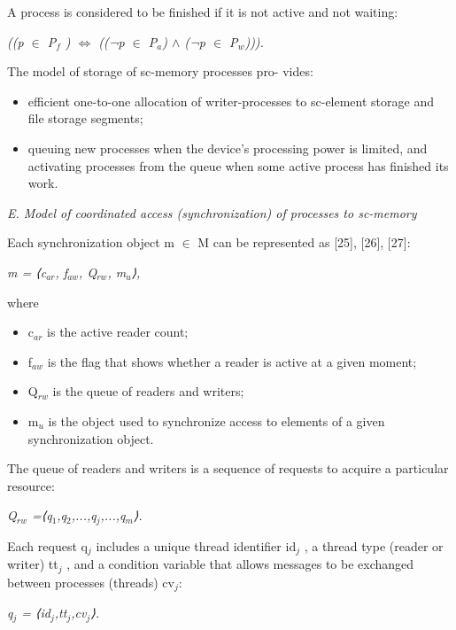 \documentclass[10pt, a4paper]{article}
\begin{document}
\begin{multicols}{2}
A process is considered to be finished if it is not active
and not waiting:
\begin{center}
    \textit{((p $\in$ P$_{f}$ )  $\Leftrightarrow$ ((¬p $\in$ P$_{a}$) $\land$ (¬p $\in$ P$_{w}$))).}
\end{center}

The model of storage of sc-memory processes pro-
vides:

\begin{itemize}
\setlength{\parskip}{0pt}
\setlength{\itemsep}{0pt}
    \item efficient one-to-one allocation of writer-processes to sc-element storage and file storage segments;
    \item queuing new processes when the device’s processing power is limited, and activating processes from the queue when some active process has finished its work.
    
\end{itemize}

\textit{E. Model of coordinated access (synchronization) of processes to sc-memory}

Each synchronization object m $\in$ M can be represented as [25], [26], [27]:
\begin{center}
    \textit{m = ⟨c$_{ar}$, f$_{aw}$, Q$_{rw}$, m$_{u}$⟩,}
\end{center}
where

\begin{itemize}
\setlength{\parskip}{0pt}
\setlength{\itemsep}{0pt}
    \item c$_{ar}$ is the active reader count;
    \item f$_{aw}$ is the flag that shows whether a reader is active
at a given moment;
    \item Q$_{rw}$ is the queue of readers and writers;
    \item m$_{u}$ is the object used to synchronize access to
elements of a given synchronization object.
\end{itemize}

The queue of readers and writers is a sequence of requests to acquire a particular resource:
\begin{center}
    \textit{Q$_{rw}$ =⟨q$_{1}$,q$_{2}$,...,q$_{j}$,...,q$_{m}$⟩.}
\end{center}

Each request q$_{j}$ includes a unique thread identifier id$_{j}$ , a thread type (reader or writer) tt$_{j}$ , and a condition variable that allows messages to be exchanged between processes (threads) cv$_{j}$:
\begin{center}
    \textit{q$_{j}$ = ⟨id$_{j}$,tt$_{j}$,cv$_{j}$⟩.}
\end{center}



\end{multicols}
\end{document}
